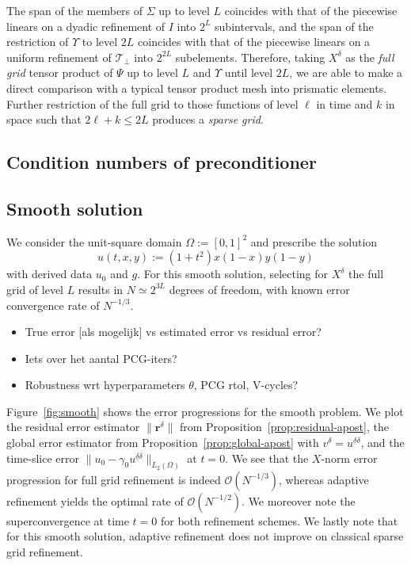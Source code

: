 \documentclass[11pt,a4paper,oneside,english]{amsart}
\numberwithin{equation}{section}
\numberwithin{theorem}{section}
\theoremstyle{definition}
\newcommand{\T}{\mathcal{T}}
\newcommand{\udelta}{{\underline{\delta}}}
\newcommand{\jw}[1]{{\color{red}{JW: #1}}}
\begin{document}
The span of the members of $\Sigma$ up to level $L$ coincides with that of the
piecewise linears on a dyadic refinement of $I$ into $2^L$ subintervals, and the
span of the restriction of $\Upsilon$ to level $2L$ coincides with that of the
piecewise linears on a uniform refinement of $\T_\perp$ into $2^{2L}$ subelements.
Therefore, taking $X^\delta$ as the \emph{full grid} tensor product of $\Psi$ up to
level $L$ and $\Upsilon$ until level $2L$, we are able to make a direct comparison
with a typical tensor product mesh into prismatic elements. \jw{meh slecht geformuleerd}
Further restriction of the full grid to those functions of level $\ell$ in time and
$k$ in space such that $2 \ell + k \leq 2L$ produces a \emph{sparse grid}.

\jw{ik mis nog een paar rake zinnen om te vergelijken met FK19 hieronder. De moeilijkheid
zit 'm in het verschil in norm + dat zelfs hun uniform-refinement solutions tov
een simplicial mesh zijn, en wij dus een tensor mesh hebben}

\subsection{Condition numbers of preconditioner}
\subsection{Smooth solution}
We consider the unit-square domain $\Omega := [0,1]^2$ and prescribe the solution
\[
  u(t,x,y) := (1 + t^2) x (1-x) y (1-y)
\]
with derived data $u_0$ and $g$. For this smooth solution, selecting for $X^\delta$
the full grid of level $L$ results in $N \simeq 2^{3L}$ degrees of freedom, with
known error convergence rate of $N^{-1/3}$.\jw{citatie}
\begin{itemize}
  \item True error [als mogelijk] vs estimated error vs residual error?
  \item Iets over het aantal PCG-iters?
  \item Robustness wrt hyperparameters $\theta$, PCG rtol, V-cycles?
\end{itemize}

Figure~\ref{fig:smooth} shows the error progressions for the smooth problem. We
plot the residual error estimator $\|\mathbf r^{\delta}\|$ from Proposition~\ref{prop:residual-apost},
the global error estimator from Proposition~\ref{prop:global-apost} with $v^\delta=u^{\udelta \delta}$,
and the time-slice error $\|u_0 - \gamma_0 u^{\udelta \delta}\|_{L_2(\Omega)}$ at $t=0$.\jw{misschien ook de $X$-norm meten?}
We see that the $X$-norm error progression for full grid refinement is indeed $\mathcal O(N^{-1/3})$,
whereas adaptive refinement yields the optimal\jw{cite} rate of $\mathcal O(N^{-1/2})$.
We moreover note the superconvergence at time $t=0$ for both refinement schemes.
We lastly note that for this smooth solution, adaptive refinement does not improve
on classical sparse grid refinement.
\end{document}
